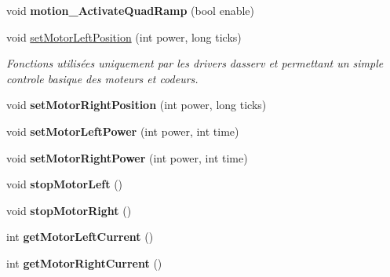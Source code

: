 \begin{DoxyCompactItemize}
\item 
\mbox{\label{classAsservEsialR_a17eab63b10a4e1edf11013e6b18cafd2}} 
void {\bfseries motion\+\_\+\+Activate\+Quad\+Ramp} (bool enable)
\item 
\mbox{\label{classAsservEsialR_a93642e8abc2116fe8937d2c00f003977}} 
void \hyperlink{classAsservEsialR_a93642e8abc2116fe8937d2c00f003977}{set\+Motor\+Left\+Position} (int power, long ticks)
\begin{DoxyCompactList}\small\item\em Fonctions utilisées uniquement par les drivers d\textquotesingle{}asserv et permettant un simple controle basique des moteurs et codeurs. \end{DoxyCompactList}\item 
\mbox{\label{classAsservEsialR_aad4a4c018d773f75ede78df09aa64bf3}} 
void {\bfseries set\+Motor\+Right\+Position} (int power, long ticks)
\item 
\mbox{\label{classAsservEsialR_ae3632c60b6f31fc32b514c73f40dd23c}} 
void {\bfseries set\+Motor\+Left\+Power} (int power, int time)
\item 
\mbox{\label{classAsservEsialR_ad235409b0ed65c2718c25a7122c69117}} 
void {\bfseries set\+Motor\+Right\+Power} (int power, int time)
\item 
\mbox{\label{classAsservEsialR_a402c8f20afb5fb72549f009867b9f71c}} 
void {\bfseries stop\+Motor\+Left} ()
\item 
\mbox{\label{classAsservEsialR_a3ef22117ab4bbc5113863599fb0896fe}} 
void {\bfseries stop\+Motor\+Right} ()
\item 
\mbox{\label{classAsservEsialR_ac80a3f0c2469353e35ec7f735e655249}} 
int {\bfseries get\+Motor\+Left\+Current} ()
\item 
\mbox{\label{classAsservEsialR_a213883db355e8a7713a324cd634d6e1b}} 
int {\bfseries get\+Motor\+Right\+Current} ()
\item 
\mbox{\label{classAsservEsialR_a92f56a44000674916dbb398c6a08d75a}} 

\end{DoxyCompactItemize}
